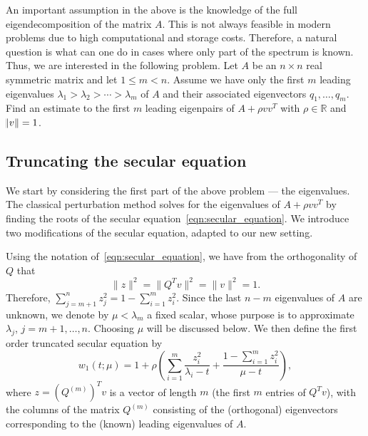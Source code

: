 \documentclass[11pt]{article}
\begin{document}
An important assumption in the above is the knowledge of the full eigendecomposition of the matrix $A$. This is not always feasible in modern problems due to high computational and storage costs. Therefore, a natural question is what can one do in cases where only part of the spectrum is known. Thus, we are interested in the following problem. Let $A$ be an ${n \times n}$ real symmetric matrix and let $1\le m < n$. Assume we have only the first $m$ leading eigenvalues $\lambda_1 > \lambda_2 > \cdots > \lambda_m$ of $A$ and their associated eigenvectors $q_1,\ldots,q_m$. Find an estimate to the first $m$ leading eigenpairs of $A + \rho vv^T$ with $\rho \in \mathbb{R}$ and $\norm{v}=1$.

\subsection{Truncating the secular equation} \label{sec:trunc_secular}


We start by considering the first part of the above problem --- the eigenvalues. The classical perturbation method solves for the eigenvalues of $A + \rho vv^T$ by finding the roots of the secular equation~\eqref{eqn:secular_equation}. We introduce two modifications of the secular equation, adapted to our new setting.

Using the notation of~\eqref{eqn:secular_equation}, we have from the orthogonality of $Q$ that 
\begin{equation}
\|z\|^2 = \|Q^Tv\|^2 = \|v\|^2 = 1.
\end{equation}
Therefore, $\sum_{j=m+1}^{n}{z_j^2} = 1 - \sum_{i=1}^{m}{z_i^2}$. Since the last $n-m$ eigenvalues of $A$ are unknown, we denote by  $\mu < \lambda_m$ a fixed scalar, whose purpose is to approximate $\lambda_j$, $j=m+1,\ldots,n$. Choosing $\mu$ will be discussed below. We then define the first order truncated secular equation by
\begin{equation} \label{eq:TSE}
w_{1}(t ; \mu) = 1 + \rho \left( \sum_{i=1}^{m} {\frac{z_i^2}{\lambda_i - t}} + \frac{1 - \sum_{i=1}^{m}{z_i^2}}{\mu - t} \right) ,
\end{equation}
where $z=(Q^{(m)})^Tv$ is a vector of length $m$ (the first $m$ entries of $Q^Tv$), with the columns of the matrix $Q^{(m)}$ consisting of the (orthogonal) eigenvectors corresponding to the (known) leading eigenvalues of $A$.
\end{document}
